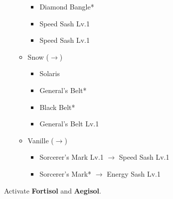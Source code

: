 \begin{menu}
\begin{itemize}
\begin{itemize}
				\begin{itemize}
					\item Diamond Bangle*
					\item Speed Sash Lv.1
					\item Speed Sash Lv.1
				\end{itemize}
			\item Snow ($\rightarrow$)
				\begin{itemize}
					\item Solaris
					\item General's Belt*
					\item Black Belt*
					\item General's Belt Lv.1
				\end{itemize}
			\item Vanille ($\rightarrow$)
				\begin{itemize}
					\item Sorcerer's Mark Lv.1 $\rightarrow$ Speed Sash Lv.1
					\item Sorcerer's Mark* $\rightarrow$ Energy Sash Lv.1
				\end{itemize}
		\end{itemize}
	\end{itemize}
\end{menu}

\renewcommand{\first}{[1] Cerberus (\com/\com/\com)}
\renewcommand{\second}{[2] Solidarity (\com/\sen/\med)}
\renewcommand{\third}{[3] Delta Attack (\com/\sen/\rav)}
\renewcommand{\fourth}{[4] Mystic Tower (\rav/\sen/\rav)}
\renewcommand{\fifth}{[5] Protection (\syn/\sen/\med)}
\renewcommand{\sixth}{[6] Tortoise (\sen/\sen/\sen)}

Activate \textbf{Fortisol} and \textbf{Aegisol}.

